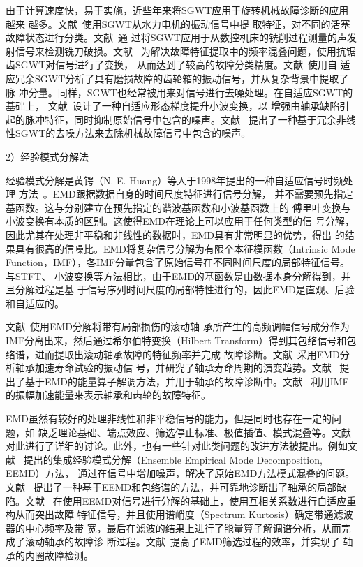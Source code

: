 由于计算速度快，易于实施，近些年来将SGWT应用于旋转机械故障诊断的应用越来
越多。文献~使用SGWT从水力电机的振动信号中提
取特征，对不同的活塞故障状态进行分类。文献~通
过将SGWT应用于从数控机床的铣削过程测量的声发射信号来检测铣刀破损。文献~
为解决故障特征提取中的频率混叠问题，使用抗锯齿SGWT对信号进行了变换，
从而达到了较高的故障分类精度。文献~使用自
适应冗余SGWT分析了具有磨损故障的齿轮箱的振动信号，并从复杂背景中提取了脉
冲分量。同样，SGWT也经常被用来对信号进行去噪处理。在自适应SGWT的基础上，
文献~设计了一种自适应形态梯度提升小波变换，以
增强由轴承缺陷引起的脉冲特征，同时抑制原始信号中包含的噪声。文献~
提出了一种基于冗余非线性SGWT的去噪方法来去除机械故障信号中包含的噪声。

2）经验模式分解法

经验模式分解是黄锷（N. E. Huang）等人于1998年提出的一种自适应信号时频处理
方法~\cite{huang1998empirical}。EMD跟据数据自身的时间尺度特征进行信号分解，
并不需要预先指定基函数。这与分别建立在预先指定的谐波基函数和小波基函数上的
傅里叶变换与小波变换有本质的区别。这使得EMD在理论上可以应用于任何类型的信
号分解，因此尤其在处理非平稳和非线性的数据时，EMD具有非常明显的优势，得出
的结果具有很高的信噪比。EMD将复杂信号分解为有限个本征模函数（Intrinsic Mode
Function，IMF），各IMF分量包含了原始信号在不同时间尺度的局部特征信号。与STFT、
小波变换等方法相比，由于EMD的基函数是由数据本身分解得到，并且分解过程是基
于信号序列时间尺度的局部特性进行的，因此EMD是直观、后验和自适应的。

文献~使用EMD分解将带有局部损伤的滚动轴
承所产生的高频调幅信号成分作为IMF分离出来，然后通过希尔伯特变换（Hilbert
Transform）得到其包络信号和包络谱，进而提取出滚动轴承故障的特征频率并完成
故障诊断。文献~采用EMD分析轴承加速寿命试验的振动信
号，并研究了轴承寿命周期的演变趋势。文献~
提出了基于EMD的能量算子解调方法，并用于轴承的故障诊断中。文献~
利用IMF的振幅加速能量来表示轴承和齿轮的故障特征。

EMD虽然有较好的处理非线性和非平稳信号的能力，但是同时也存在一定的问题，如
缺乏理论基础、端点效应、筛选停止标准、极值插值、模式混叠等。文献~
对此进行了详细的讨论。此外，也有一些针对此类问题的改进方法被提出。例如文献~
提出的集成经验模式分解（Ensemble Empirical Mode Decomposition, EEMD）方法，
通过在信号中增加噪声，解决了原始EMD方法模式混叠的问题。文献~
提出了一种基于EEMD和包络谱的方法，并可靠地诊断出了轴承的局部缺陷。文献~
在使用EEMD对信号进行分解的基础上，使用互相关系数进行自适应重构从而突出故障
特征信号，并且使用谱峭度（Spectrum Kurtosis）确定带通滤波器的中心频率及带
宽，最后在滤波的结果上进行了能量算子解调谱分析，从而完成了滚动轴承的故障诊
断过程。文献~提高了EMD筛选过程的效率，并实现了
轴承的内圈故障检测。

